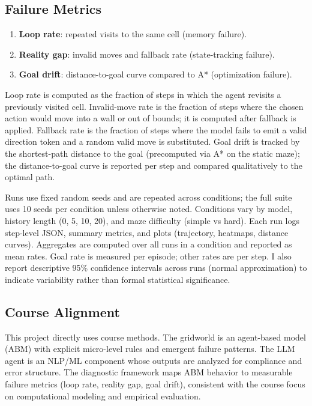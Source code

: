 \documentclass[conference]{IEEEtran}
\begin{document}
\subsection{Failure Metrics}
\begin{enumerate}[leftmargin=*]
  \item \textbf{Loop rate}: repeated visits to the same cell (memory failure).
  \item \textbf{Reality gap}: invalid moves and fallback rate (state-tracking failure).
  \item \textbf{Goal drift}: distance-to-goal curve compared to A* (optimization failure).
\end{enumerate}

Loop rate is computed as the fraction of steps in which the agent revisits a previously visited cell. Invalid-move rate is the fraction of steps where the chosen action would move into a wall or out of bounds; it is computed after fallback is applied. Fallback rate is the fraction of steps where the model fails to emit a valid direction token and a random valid move is substituted. Goal drift is tracked by the shortest-path distance to the goal (precomputed via A* on the static maze); the distance-to-goal curve is reported per step and compared qualitatively to the optimal path.

Runs use fixed random seeds and are repeated across conditions; the full suite uses 10 seeds per condition unless otherwise noted. Conditions vary by model, history length (0, 5, 10, 20), and maze difficulty (simple vs hard). Each run logs step-level JSON, summary metrics, and plots (trajectory, heatmaps, distance curves). Aggregates are computed over all runs in a condition and reported as mean rates. Goal rate is measured per episode; other rates are per step. I also report descriptive 95\% confidence intervals across runs (normal approximation) to indicate variability rather than formal statistical significance.

\subsection{Course Alignment}
This project directly uses course methods. The gridworld is an agent-based model (ABM) with explicit micro-level rules and emergent failure patterns. The LLM agent is an NLP/ML component whose outputs are analyzed for compliance and error structure. The diagnostic framework maps ABM behavior to measurable failure metrics (loop rate, reality gap, goal drift), consistent with the course focus on computational modeling and empirical evaluation.
\end{document}
